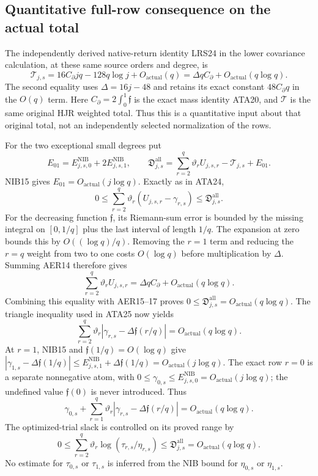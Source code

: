 \documentclass[11pt,a4paper]{article}
\begin{document}
\subsection{Quantitative full-row consequence on the actual total}
The independently derived native-return identity LRS24 in the lower
covariance calculation, at these same source orders and degree, is
\[
 \mathcal T_{j,s}
 =16C_\partial jq-128q\log j+O_{\mathrm{actual}}(q)
 =\Delta qC_\partial+O_{\mathrm{actual}}(q\log q).        \tag{AER15}
\]
The second equality uses $\Delta=16j-48$ and retains its exact
constant $48C_\partial q$ in the $O(q)$ term.
Here $C_\partial=2\int_0^1\mathfrak f$ is the exact mass identity
ATA20, and $\mathcal T$ is the same original HJR weighted total.
Thus this is a quantitative input about that original total,
not an independently selected normalization of the rows.

For the two exceptional small degrees put
\[
 E_{01}=E^{\mathrm{NIB}}_{j,s,0}
                  +2E^{\mathrm{NIB}}_{j,s,1},\qquad
 \mathfrak D^{\mathrm{all}}_{j,s}
 =\sum_{r=2}^q\vartheta_rU_{j,s,r}-\mathcal T_{j,s}+E_{01}.
                                                               \tag{AER16}
\]
NIB15 gives $E_{01}=O_{\mathrm{actual}}(j\log q)$.
Exactly as in ATA24,
\[
 0\le\sum_{r=2}^q\vartheta_r(U_{j,s,r}-\gamma_{r,s})
              \le\mathfrak D^{\mathrm{all}}_{j,s}.       \tag{AER17}
\]
For the decreasing function $\mathfrak f$, its Riemann-sum error
is bounded by the missing integral on $[0,1/q]$ plus the last
interval of length $1/q$.  The expansion at zero bounds this by
$O((\log q)/q)$.  Removing the $r=1$ term and reducing the $r=q$
weight from two to one costs $O(\log q)$ before multiplication by
$\Delta$.  Summing AER14 therefore gives
\[
 \sum_{r=2}^q\vartheta_rU_{j,s,r}
 =\Delta qC_\partial+O_{\mathrm{actual}}(q\log q).
\]
Combining this equality with AER15--17 proves
$0\le\mathfrak D^{\mathrm{all}}_{j,s}
=O_{\mathrm{actual}}(q\log q)$.
The triangle inequality used in ATA25 now yields
\[
 \sum_{r=2}^q\vartheta_r
       |\gamma_{r,s}-\Delta\mathfrak f(r/q)|
              =O_{\mathrm{actual}}(q\log q).             \tag{AER18}
\]
At $r=1$, NIB15 and $\mathfrak f(1/q)=O(\log q)$ give
$|\gamma_{1,s}-\Delta\mathfrak f(1/q)|
\le E^{\mathrm{NIB}}_{j,s,1}+\Delta\mathfrak f(1/q)
=O_{\mathrm{actual}}(j\log q)$.
The exact row $r=0$ is a separate nonnegative atom, with
$0\le\gamma_{0,s}\le E^{\mathrm{NIB}}_{j,s,0}
=O_{\mathrm{actual}}(j\log q)$; the undefined value
$\mathfrak f(0)$ is never introduced.  Thus
\[
 \boxed{\quad
 \gamma_{0,s}+\sum_{r=1}^q\vartheta_r
         |\gamma_{r,s}-\Delta\mathfrak f(r/q)|
          =O_{\mathrm{actual}}(q\log q).
 \quad}                                                \tag{AER19}
\]
The optimized-trial slack is controlled on its proved range by
\[
 0\le\sum_{r=2}^q\vartheta_r\log(\tau_{r,s}/\eta_{r,s})
       \le\mathfrak D^{\mathrm{all}}_{j,s}
       =O_{\mathrm{actual}}(q\log q).                   \tag{AER20}
\]
No estimate for $\tau_{0,s}$ or $\tau_{1,s}$ is inferred from the
NIB bound for $\eta_{0,s}$ or $\eta_{1,s}$.
\end{document}

